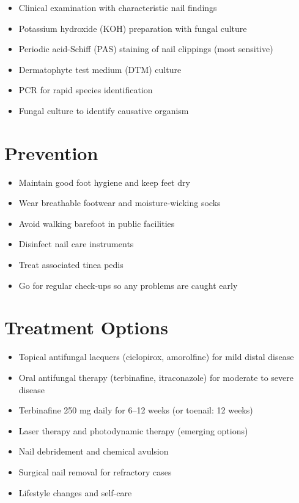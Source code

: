 \begin{itemize}[noitemsep]
  \item Clinical examination with characteristic nail findings
  \item Potassium hydroxide (KOH) preparation with fungal culture
  \item Periodic acid-Schiff (PAS) staining of nail clippings (most sensitive)
  \item Dermatophyte test medium (DTM) culture
  \item PCR for rapid species identification
  \item Fungal culture to identify causative organism
\end{itemize}

\section{Prevention}

\begin{itemize}[noitemsep]
  \item Maintain good foot hygiene and keep feet dry
  \item Wear breathable footwear and moisture-wicking socks
  \item Avoid walking barefoot in public facilities
  \item Disinfect nail care instruments
  \item Treat associated tinea pedis
  \item Go for regular check-ups so any problems are caught early
\end{itemize}

\section{Treatment Options}

\begin{itemize}[noitemsep]
  \item Topical antifungal lacquers (ciclopirox, amorolfine) for mild distal disease
  \item Oral antifungal therapy (terbinafine, itraconazole) for moderate to severe disease
  \item Terbinafine 250 mg daily for 6--12 weeks (or toenail: 12 weeks)
  \item Laser therapy and photodynamic therapy (emerging options)
  \item Nail debridement and chemical avulsion
  \item Surgical nail removal for refractory cases
  \item Lifestyle changes and self-care
\end{itemize}

